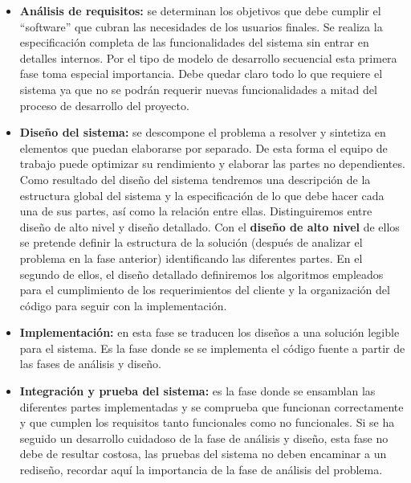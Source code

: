 \begin{itemize}
\item \textbf{Análisis de requisitos:} se determinan los objetivos que debe cumplir el ``software'' que cubran las necesidades de los usuarios finales. Se realiza la especificación completa de las funcionalidades del sistema sin entrar en detalles internos.
\bigskip
Por el tipo de modelo de desarrollo secuencial esta primera fase toma especial importancia. Debe quedar claro todo lo que requiere el sistema ya que no se podrán requerir nuevas funcionalidades a mitad del proceso de desarrollo del proyecto.

\item \textbf{Diseño del sistema:} se descompone el problema a resolver y sintetiza en elementos que puedan elaborarse por separado. De esta forma el equipo de trabajo puede optimizar su rendimiento y elaborar las partes no dependientes. Como resultado del diseño del sistema tendremos una descripción de la estructura global del sistema y la especificación de lo que debe hacer cada una de sus partes, así como la relación entre ellas.
\bigskip
Distinguiremos entre diseño de alto nivel y diseño detallado. Con el \textbf{diseño de alto nivel} de ellos se pretende definir la estructura de la solución (después de analizar el problema en la fase anterior) identificando las diferentes partes. En el segundo de ellos, el {diseño detallado} definiremos los algoritmos empleados para el cumplimiento de los requerimientos del cliente y la organización del código para seguir con la implementación.

\item \textbf{Implementación:} en esta fase se traducen los diseños a una solución legible para el sistema. Es la fase donde se se implementa el código fuente a partir de las fases de análisis y diseño. 

\item \textbf{Integración y prueba del sistema: } es la fase donde se ensamblan las diferentes partes implementadas y se comprueba que funcionan correctamente y que cumplen los requisitos tanto funcionales como no funcionales. Si se ha seguido un desarrollo cuidadoso de la fase de análisis y diseño, esta fase no debe de resultar costosa, las pruebas del sistema no deben encaminar a un rediseño, recordar aquí la importancia de la fase de análisis del problema. 


\end{itemize}
